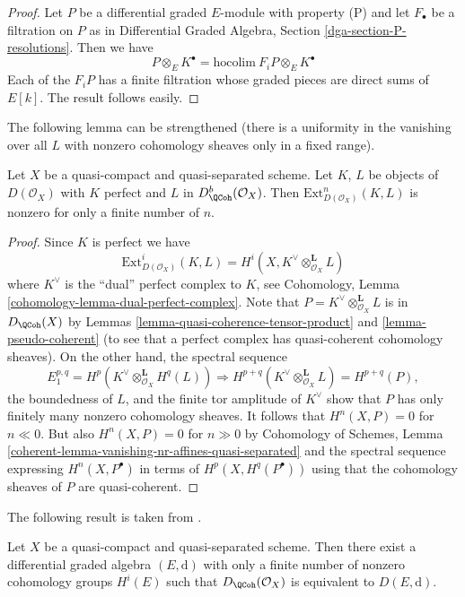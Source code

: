 \begin{proof}
Let $P$ be a differential graded $E$-module with property (P)
and let $F_\bullet$ be a filtration on $P$ as in
Differential Graded Algebra, Section \ref{dga-section-P-resolutions}.
Then we have
$$
P \otimes_E K^\bullet = \text{hocolim}\ F_iP \otimes_E K^\bullet
$$
Each of the $F_iP$ has a finite filtration whose graded pieces
are direct sums of $E[k]$. The result follows easily.
\end{proof}

\noindent
The following lemma can be strengthened (there is a uniformity
in the vanishing over all $L$ with nonzero cohomology sheaves
only in a fixed range).

\begin{lemma}
\label{lemma-ext-from-perfect-into-bounded-QCoh}
Let $X$ be a quasi-compact and quasi-separated scheme.
Let $K$, $L$ be objects of $D(\mathcal{O}_X)$ with
$K$ perfect and $L$ in $D^b_\QCoh(\mathcal{O}_X)$.
Then $\text{Ext}^n_{D(\mathcal{O}_X)}(K, L)$ is nonzero
for only a finite number of $n$.
\end{lemma}

\begin{proof}
Since $K$ is perfect we have
$$
\text{Ext}^i_{D(\mathcal{O}_X)}(K, L) =
H^i(X, K^\vee \otimes_{\mathcal{O}_X}^\mathbf{L} L)
$$
where $K^\vee$ is the ``dual'' perfect complex to $K$, see
Cohomology, Lemma \ref{cohomology-lemma-dual-perfect-complex}.
Note that $P = K^\vee \otimes_{\mathcal{O}_X}^\mathbf{L} L$
is in $D_\QCoh(X)$ by
Lemmas \ref{lemma-quasi-coherence-tensor-product} and
\ref{lemma-pseudo-coherent} (to see that a perfect complex
has quasi-coherent cohomology sheaves). On the other hand,
the spectral sequence
$$
E_1^{p, q} = H^p(K^\vee \otimes_{\mathcal{O}_X}^\mathbf{L} H^q(L))
\Rightarrow
H^{p + q}(K^\vee \otimes_{\mathcal{O}_X}^\mathbf{L} L) = H^{p + q}(P),
$$
the boundedness of $L$, and the finite tor amplitude of $K^\vee$
show that $P$ has only finitely many nonzero cohomology sheaves.
It follows that $H^n(X, P) = 0$ for $n \ll 0$.
But also $H^n(X, P) = 0$ for $n \gg 0$ by
Cohomology of Schemes, Lemma
\ref{coherent-lemma-vanishing-nr-affines-quasi-separated}
and the spectral sequence expressing $H^n(X, P^\bullet)$
in terms of $H^p(X, H^q(P^\bullet))$ using that the cohomology
sheaves of $P$ are quasi-coherent.
\end{proof}

\noindent
The following result is taken from \cite{BvdB}.

\begin{theorem}
\label{theorem-DQCoh-is-Ddga}
Let $X$ be a quasi-compact and quasi-separated scheme.
Then there exist a differential graded algebra $(E, \text{d})$
with only a finite number of nonzero cohomology groups $H^i(E)$
such that $D_\QCoh(\mathcal{O}_X)$ is equivalent
to $D(E, \text{d})$.
\end{theorem}

